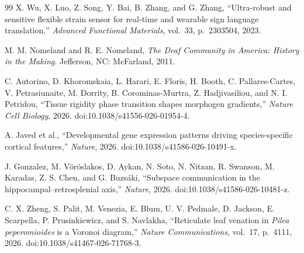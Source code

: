 \documentclass[11pt, a4paper]{article}
\theoremstyle{definition}
\begin{document}
\begin{thebibliography}{99}
X. Wu, X. Luo, Z. Song, Y. Bai, B. Zhang, and G. Zhang,
``Ultra-robust and sensitive flexible strain sensor for real-time and wearable sign language translation,''
\textit{Advanced Functional Materials}, vol.~33, p.~2303504, 2023.

M. M. Nomeland and R. E. Nomeland,
\textit{The Deaf Community in America: History in the Making}.
Jefferson, NC: McFarland, 2011.

C. Autorino, D. Khoromskaia, L. Harari, E. Floris, H. Booth, C. Pallares-Cartes,
V. Petrasiunaite, M. Dorrity, B. Corominas-Murtra, Z. Hadjivasiliou, and N. I. Petridou,
``Tissue rigidity phase transition shapes morphogen gradients,''
\textit{Nature Cell Biology}, 2026.
doi:10.1038/s41556-026-01954-4.

A. Javed et al.,
``Developmental gene expression patterns driving species-specific cortical features,''
\textit{Nature}, 2026.
doi:10.1038/s41586-026-10491-x.

J. Gonzalez, M. V\"{o}r\"{o}slakos, D. Aykan, N. Soto, N. Nitzan, R. Swanson,
M. Karadas, Z. S. Chen, and G. Buzs\'{a}ki,
``Subspace communication in the hippocampal--retrosplenial axis,''
\textit{Nature}, 2026.
doi:10.1038/s41586-026-10481-z.

C. X. Zheng, S. Palit, M. Venezia, E. Blum, U. V. Pedmale, D. Jackson, E. Scarpella,
P. Prusinkiewicz, and S. Navlakha,
``Reticulate leaf venation in \textit{Pilea peperomioides} is a Voronoi diagram,''
\textit{Nature Communications}, vol.~17, p.~4111, 2026.
doi:10.1038/s41467-026-71768-3.

\end{thebibliography}
\end{document}
